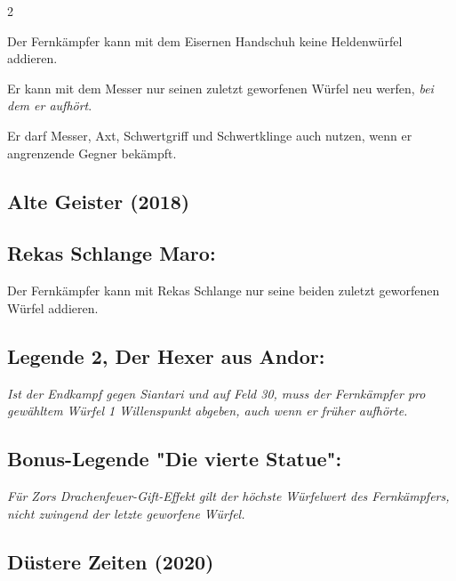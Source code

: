 \documentclass[10pt, a4paper, oneside]{book}
\newcommand{\fan}[1]{\textit{#1}}
\begin{document}
\begin{multicols*}{2}
\begin{bgcolor}
Der Fernkämpfer kann mit dem Eisernen Handschuh keine Heldenwürfel addieren.
\supercite{DlH:Begleitheft}

Er kann mit dem Messer nur seinen zuletzt geworfenen Würfel neu werfen,\supercite{DlH:Begleitheft} \fan{bei dem er aufhört}.

Er darf Messer, Axt, Schwertgriff und Schwertklinge auch nutzen, wenn er angrenzende Gegner bekämpft.
\supercite{DlH:Begleitheft}


\end{bgcolor}



\begin{bgcolor}[color-AG]
\section{Alte Geister (2018)}

\subsection{Rekas Schlange Maro:}

Der Fernkämpfer kann mit Rekas Schlange nur seine beiden zuletzt geworfenen Würfel addieren.
\supercite{AG:Begleitheft}


\subsection{Legende 2, Der Hexer aus Andor:}

\fan{Ist der Endkampf gegen Siantari und auf Feld 30, muss der Fernkämpfer pro gewähltem Würfel 1 Willenspunkt abgeben, auch wenn er früher aufhörte.}


\subsection{Bonus-Legende "Die vierte Statue":}

\fan{Für Zors Drachenfeuer-Gift-Effekt gilt der höchste Würfelwert des Fernkämpfers, nicht zwingend der letzte geworfene Würfel.}


\end{bgcolor}



\columnbreak





\begin{bgcolor}[color-DZ]
\section{Düstere Zeiten (2020)}


\end{bgcolor}
\end{multicols*}
\end{document}
